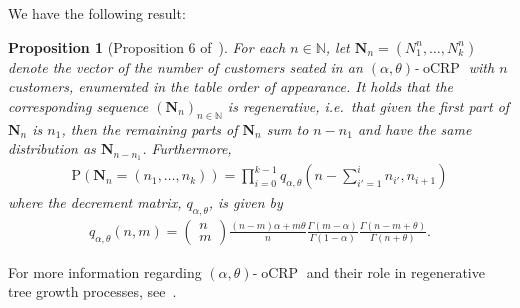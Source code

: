 \documentclass[a4paper, final]{amsart}
\theoremstyle{plain}
\newtheorem{prop}[thm]{Proposition}
\theoremstyle{definition}
\DeclareMathOperator{\ocrp}{oCRP}
\newcommand{\nin}{{n \in \mathbb{N}}}
\renewcommand{\P}{\mathrm{P}}
\begin{document}
We have the following result:
%
\begin{prop}[Proposition 6 of~\cite{RefWorks:doc:5b6c5580e4b0a3935d3436d8}]\label{prop:decrementmatrix}
  For each $\nin$, let ${\mathbf{N}}_n = (N_1^n, \ldots, N_k^n)$ denote the vector of the number of customers seated in an $(\alpha, \theta)$-$\ocrp$ with $n$ customers, enumerated in the table order of appearance.
  It holds that the corresponding sequence ${({\mathbf{N}}_n)}_\nin$ is regenerative, i.e.\ that given the first part of $\mathbf{N}_n$ is $n_1$, then the remaining parts of $\mathbf{N}_n$ sum to $n - n_1$ and have the same distribution as $\mathbf{N}_{n - n_1}$.
  Furthermore, 
  \begin{align}
    \P \left( \mathbf{N}_n = (n_1, \ldots, n_k) \right)
    = \prod_{i=0}^{k-1} q_{\alpha, \theta} \left(  n - \sum_{i' = 1}^{i} n_{i'},  n_{i + 1} \right) 
    \label{eq:decrementmatrixdist}
  \end{align}
  where the \textit{decrement matrix}, $q_{\alpha, \theta}$, is given by
  \begin{align}
    q_{\alpha, \theta}(n,m) =
    \begin{pmatrix}
      n \\ m
    \end{pmatrix}
    \frac{(n - m)\alpha + m\theta}{n} \frac{\Gamma(m-\alpha)}{\Gamma(1-\alpha)} \frac{\Gamma(n-m+\theta)}{\Gamma(n+\theta)}.
    \label{eq:decrementmatrix}
  \end{align}
\end{prop}
%
\noindent
For more information regarding $(\alpha, \theta)$-$\ocrp$ and their role in regenerative tree growth processes, see~\cite{RefWorks:doc:5b6c5580e4b0a3935d3436d8}.
%
\end{document}

